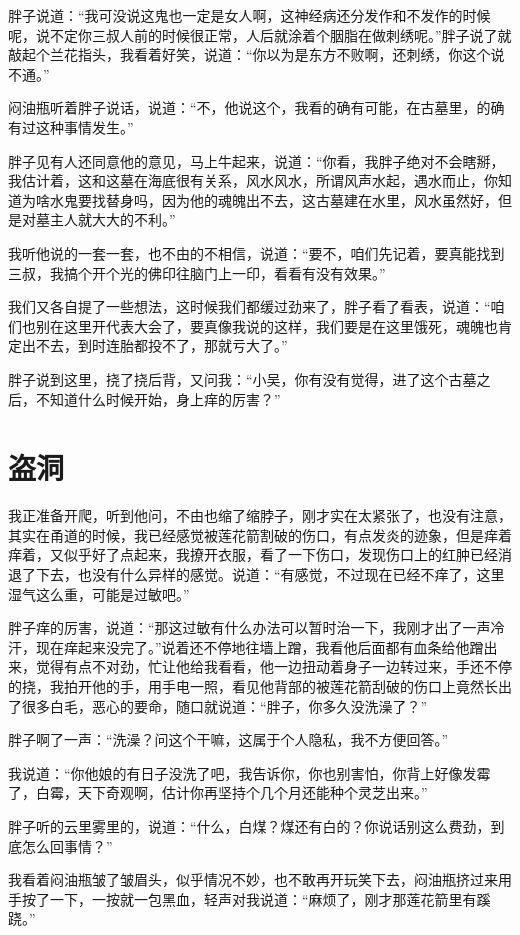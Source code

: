 胖子说道：“我可没说这鬼也一定是女人啊，这神经病还分发作和不发作的时候呢，说不定你三叔人前的时候很正常，人后就涂着个胭脂在做刺绣呢。”胖子说了就敲起个兰花指头，我看着好笑，说道：“你以为是东方不败啊，还刺绣，你这个说不通。”

闷油瓶听着胖子说话，说道：“不，他说这个，我看的确有可能，在古墓里，的确有过这种事情发生。”

胖子见有人还同意他的意见，马上牛起来，说道：“你看，我胖子绝对不会瞎掰，我估计着，这和这墓在海底很有关系，风水风水，所谓风声水起，遇水而止，你知道为啥水鬼要找替身吗，因为他的魂魄出不去，这古墓建在水里，风水虽然好，但是对墓主人就大大的不利。”

我听他说的一套一套，也不由的不相信，说道：“要不，咱们先记着，要真能找到三叔，我搞个开个光的佛印往脑门上一印，看看有没有效果。”

我们又各自提了一些想法，这时候我们都缓过劲来了，胖子看了看表，说道：“咱们也别在这里开代表大会了，要真像我说的这样，我们要是在这里饿死，魂魄也肯定出不去，到时连胎都投不了，那就亏大了。”

胖子说到这里，挠了挠后背，又问我：“小吴，你有没有觉得，进了这个古墓之后，不知道什么时候开始，身上痒的厉害？”

\chapter{盗洞}

我正准备开爬，听到他问，不由也缩了缩脖子，刚才实在太紧张了，也没有注意，其实在甬道的时候，我已经感觉被莲花箭割破的伤口，有点发炎的迹象，但是痒着痒着，又似乎好了点起来，我撩开衣服，看了一下伤口，发现伤口上的红肿已经消退了下去，也没有什么异样的感觉。说道：“有感觉，不过现在已经不痒了，这里湿气这么重，可能是过敏吧。”

胖子痒的厉害，说道：“那这过敏有什么办法可以暂时治一下，我刚才出了一声冷汗，现在痒起来没完了。”说着还不停地往墙上蹭，我看他后面都有血条给他蹭出来，觉得有点不对劲，忙让他给我看看，他一边扭动着身子一边转过来，手还不停的挠，我拍开他的手，用手电一照，看见他背部的被莲花箭刮破的伤口上竟然长出了很多白毛，恶心的要命，随口就说道：“胖子，你多久没洗澡了？”

胖子啊了一声：“洗澡？问这个干嘛，这属于个人隐私，我不方便回答。”

我说道：“你他娘的有日子没洗了吧，我告诉你，你也别害怕，你背上好像发霉了，白霉，天下奇观啊，估计你再坚持个几个月还能种个灵芝出来。”

胖子听的云里雾里的，说道：“什么，白煤？煤还有白的？你说话别这么费劲，到底怎么回事情？”

我看着闷油瓶皱了皱眉头，似乎情况不妙，也不敢再开玩笑下去，闷油瓶挤过来用手按了一下，一按就一包黑血，轻声对我说道：“麻烦了，刚才那莲花箭里有蹊跷。”

